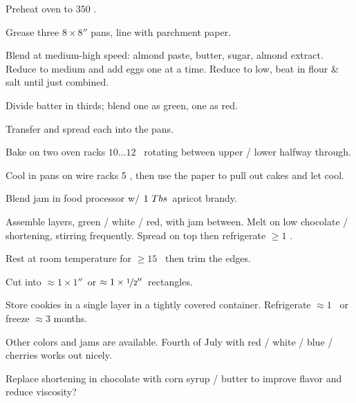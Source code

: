 \begin{preparation}
\item Preheat oven to $350$ \Fahrenheit.

\item Grease three $8\times8''$ pans, line with parchment paper.

\item Blend at medium-high speed: almond paste, butter, sugar, almond extract.
Reduce to medium and add eggs one at a time.
Reduce to low, beat in flour \& salt until just combined.

\item Divide batter in thirds; blend one as green, one as red.

\item Transfer and spread each into the pans.

\item Bake on two oven racks $10 \dots 12$ \minute~rotating between upper / lower halfway through.

\item Cool in pans on wire racks 5 \minute,
	then use the paper to pull out cakes and let cool.

\item Blend jam in food processor w/ $1~Tbs$~apricot brandy.

\item Assemble layers, green / white / red, with jam between.
	Melt on low chocolate / shortening, stirring frequently.
	Spread on top then refrigerate $\geq1$ \hour.

\item Rest at room temperature for $\geq 15$ \minute~then trim the edges.

\item Cut into $\approx 1\times 1''$~or $\approx 1\times \nicefrac{1}{2}''$~rectangles.

\item Store cookies in a single layer in a tightly covered container.
	Refrigerate $\approx 1$ \week~or freeze $\approx 3$ months.
\end{preparation}


\begin{variation}
\item Other colors and jams are available.
	Fourth of July with red / white / blue / cherries works out nicely.
\end{variation}


\begin{experiments}
\item Replace shortening in chocolate with corn syrup / butter to improve flavor and reduce viscosity?
\end{experiments}


\recipeend%
